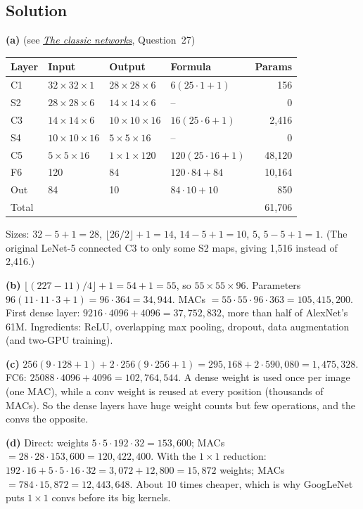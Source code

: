 \documentclass[12pt,a4paper]{article}
\newcommand{\seeconcept}[3]{(see \hyperref[#1]{\textit{#2}}, Question~#3)}
\begin{document}
\subsection*{Solution}
\textbf{(a)} \seeconcept{c:history}{The classic networks}{27}
\begin{center}
\begin{tabular}{@{}llllr@{}}
\toprule
Layer & Input & Output & Formula & Params\\
\midrule
C1 & $32\times32\times1$ & $28\times28\times6$ & $6(25\cdot1+1)$ & 156\\
S2 & $28\times28\times6$ & $14\times14\times6$ & -- & 0\\
C3 & $14\times14\times6$ & $10\times10\times16$ & $16(25\cdot6+1)$ & 2{,}416\\
S4 & $10\times10\times16$ & $5\times5\times16$ & -- & 0\\
C5 & $5\times5\times16$ & $1\times1\times120$ & $120(25\cdot16+1)$ & 48{,}120\\
F6 & 120 & 84 & $120\cdot84+84$ & 10{,}164\\
Out & 84 & 10 & $84\cdot10+10$ & 850\\
\midrule
Total & & & & 61{,}706\\
\bottomrule
\end{tabular}
\end{center}
Sizes: $32-5+1=28$, $\lfloor26/2\rfloor+1=14$, $14-5+1=10$, $5$, $5-5+1=1$. (The original LeNet-5 connected C3 to only some S2 maps, giving 1{,}516 instead of 2{,}416.)

\textbf{(b)} $\lfloor(227-11)/4\rfloor+1=54+1=55$, so $55\times55\times96$. Parameters $96(11\cdot11\cdot3+1)=96\cdot364=34{,}944$. MACs $=55\cdot55\cdot96\cdot363=105{,}415{,}200$. First dense layer: $9216\cdot4096+4096=37{,}752{,}832$, more than half of AlexNet's 61M. Ingredients: ReLU, overlapping max pooling, dropout, data augmentation (and two-GPU training).

\textbf{(c)} $256(9\cdot128+1)+2\cdot256(9\cdot256+1)=295{,}168+2\cdot590{,}080=1{,}475{,}328$. FC6: $25088\cdot4096+4096=102{,}764{,}544$. A dense weight is used once per image (one MAC), while a conv weight is reused at every position (thousands of MACs). So the dense layers have huge weight counts but few operations, and the convs the opposite.

\textbf{(d)} Direct: weights $5\cdot5\cdot192\cdot32=153{,}600$; MACs $=28\cdot28\cdot153{,}600=120{,}422{,}400$. With the $1\times1$ reduction: $192\cdot16+5\cdot5\cdot16\cdot32=3{,}072+12{,}800=15{,}872$ weights; MACs $=784\cdot15{,}872=12{,}443{,}648$. About 10 times cheaper, which is why GoogLeNet puts $1\times1$ convs before its big kernels.
\end{document}
